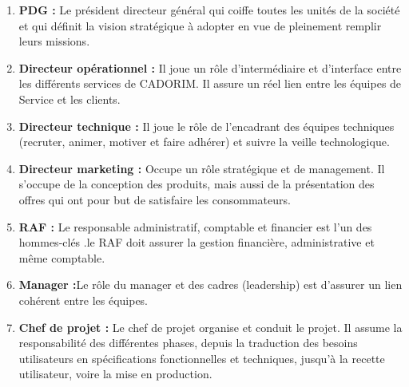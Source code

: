 \begin{enumerate}
	\item \textbf{PDG : }Le président directeur général qui coiffe toutes les unités de la société et qui définit la vision stratégique
	à adopter en vue de pleinement remplir leurs missions.
	\item \textbf{Directeur opérationnel :} Il joue un rôle d’intermédiaire et d’interface entre les différents services de CADORIM. Il assure un réel lien entre les équipes de Service et les clients.
	\item \textbf{Directeur technique :} Il joue le rôle de l'encadrant des équipes techniques (recruter, animer, motiver et faire adhérer) et suivre la veille technologique.
	\item \textbf{Directeur marketing :} Occupe un rôle stratégique et de management. Il s’occupe de la conception des produits, mais aussi de la présentation des offres qui ont pour but de satisfaire les consommateurs.
	\item \textbf{RAF :} Le responsable administratif, comptable et financier est l’un des hommes-clés .le RAF doit assurer la gestion financière, administrative et même comptable.
	
	
	\item \textbf{Manager :}Le rôle du manager  et des cadres (leadership) est d’assurer un lien cohérent entre les équipes.
	\item \textbf{Chef de projet :} Le chef de projet organise et conduit le projet. Il assume la responsabilité des différentes phases, depuis la traduction des besoins utilisateurs en spécifications fonctionnelles et techniques, jusqu'à la recette utilisateur, voire la mise en production.
\end{enumerate}

